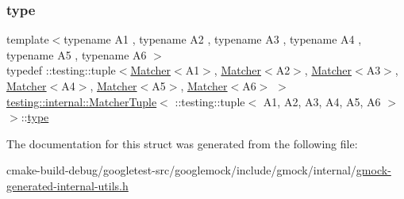 \subsubsection{\texorpdfstring{type}{type}}
{\footnotesize\ttfamily template$<$typename A1 , typename A2 , typename A3 , typename A4 , typename A5 , typename A6 $>$ \\
typedef \+::testing\+::tuple$<$\mbox{\hyperlink{classtesting_1_1Matcher}{Matcher}}$<$A1$>$, \mbox{\hyperlink{classtesting_1_1Matcher}{Matcher}}$<$A2$>$, \mbox{\hyperlink{classtesting_1_1Matcher}{Matcher}}$<$A3$>$, \mbox{\hyperlink{classtesting_1_1Matcher}{Matcher}}$<$A4$>$, \mbox{\hyperlink{classtesting_1_1Matcher}{Matcher}}$<$A5$>$, \mbox{\hyperlink{classtesting_1_1Matcher}{Matcher}}$<$A6$>$ $>$ \mbox{\hyperlink{structtesting_1_1internal_1_1MatcherTuple}{testing\+::internal\+::\+Matcher\+Tuple}}$<$ \+::testing\+::tuple$<$ A1, A2, A3, A4, A5, A6 $>$ $>$\+::\mbox{\hyperlink{structtesting_1_1internal_1_1MatcherTuple_3_01_1_1testing_1_1tuple_3_01A1_00_01A2_00_01A3_00_01A4_00_01A5_00_01A6_01_4_01_4_ab153a3308ca82444de060ff9f0c56f8a}{type}}}



The documentation for this struct was generated from the following file\+:\begin{DoxyCompactItemize}
\item 
cmake-\/build-\/debug/googletest-\/src/googlemock/include/gmock/internal/\mbox{\hyperlink{gmock-generated-internal-utils_8h}{gmock-\/generated-\/internal-\/utils.\+h}}\end{DoxyCompactItemize}
